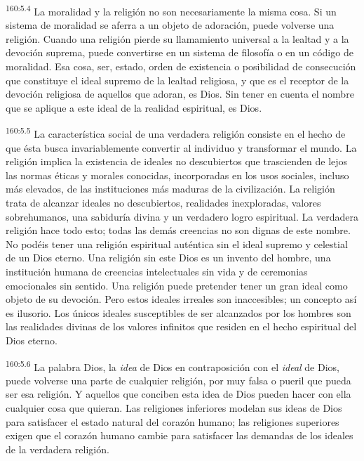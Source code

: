 \par
\textsuperscript{160:5.4} La moralidad y la religión no son necesariamente la misma cosa. Si un sistema de moralidad se aferra a un objeto de adoración, puede volverse una religión. Cuando una religión pierde su llamamiento universal a la lealtad y a la devoción suprema, puede convertirse en un sistema de filosofía o en un código de moralidad. Esa cosa, ser, estado, orden de existencia o posibilidad de consecución que constituye el ideal supremo de la lealtad religiosa, y que es el receptor de la devoción religiosa de aquellos que adoran, es Dios. Sin tener en cuenta el nombre que se aplique a este ideal de la realidad espiritual, es Dios.

\par
\textsuperscript{160:5.5} La característica social de una verdadera religión consiste en el hecho de que ésta busca invariablemente convertir al individuo y transformar el mundo. La religión implica la existencia de ideales no descubiertos que trascienden de lejos las normas éticas y morales conocidas, incorporadas en los usos sociales, incluso más elevados, de las instituciones más maduras de la civilización. La religión trata de alcanzar ideales no descubiertos, realidades inexploradas, valores sobrehumanos, una sabiduría divina y un verdadero logro espiritual. La verdadera religión hace todo esto; todas las demás creencias no son dignas de este nombre. No podéis tener una religión espiritual auténtica sin el ideal supremo y celestial de un Dios eterno. Una religión sin este Dios es un invento del hombre, una institución humana de creencias intelectuales sin vida y de ceremonias emocionales sin sentido. Una religión puede pretender tener un gran ideal como objeto de su devoción. Pero estos ideales irreales son inaccesibles; un concepto así es ilusorio. Los únicos ideales susceptibles de ser alcanzados por los hombres son las realidades divinas de los valores infinitos que residen en el hecho espiritual del Dios eterno.

\par
\textsuperscript{160:5.6} La palabra Dios, la \textit{idea} de Dios en contraposición con el \textit{ideal} de Dios, puede volverse una parte de cualquier religión, por muy falsa o pueril que pueda ser esa religión. Y aquellos que conciben esta idea de Dios pueden hacer con ella cualquier cosa que quieran. Las religiones inferiores modelan sus ideas de Dios para satisfacer el estado natural del corazón humano; las religiones superiores exigen que el corazón humano cambie para satisfacer las demandas de los ideales de la verdadera religión.

